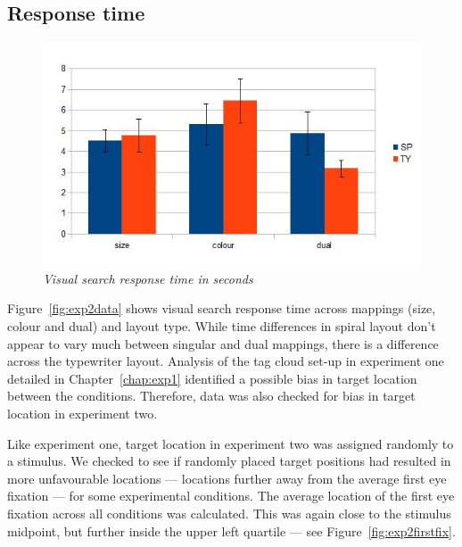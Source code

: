 \subsection{Response time} \label{subsect:responsetime}

\begin{figure}[!htb]
	\centering
	\includegraphics[scale=0.40]{exp2.jpg}
	\caption{\textit{Visual search response time in seconds}}
	\label{fig:exp2data}
\end{figure}

Figure~\vref{fig:exp2data} shows visual search response time across mappings (size, colour and dual) and layout type. While time differences in spiral layout don't appear to vary much between singular and dual mappings, there is a difference across the typewriter layout. Analysis of the tag cloud set-up in experiment one detailed in Chapter~\ref{chap:exp1} identified a possible bias in target location between the conditions. Therefore, data was also checked for bias in target location in experiment two.

Like experiment one, target location in experiment two was assigned randomly to a stimulus. We checked to see if randomly placed target positions had resulted in more unfavourable locations --- locations further away from the average first eye fixation --- for some experimental conditions. The average location of the first eye fixation across all conditions was calculated. This was again close to the stimulus midpoint, but further inside the upper left quartile --- see Figure~\vref{fig:exp2firstfix}.

